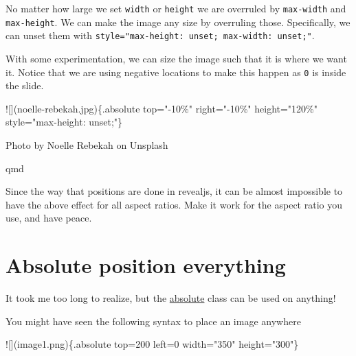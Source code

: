 \documentclass[
  letterpaper,
  DIV=11,
  numbers=noendperiod]{scrreprt}
\newenvironment{Shaded}{\begin{snugshade}}{\end{snugshade}}
\newcommand{\AlertTok}[1]{\textcolor[rgb]{0.68,0.00,0.00}{#1}}
\newcommand{\NormalTok}[1]{\textcolor[rgb]{0.00,0.23,0.31}{#1}}
\begin{document}
No matter how large we set \texttt{width} or \texttt{height} we are
overruled by \texttt{max-width} and \texttt{max-height}. We can make the
image any size by overruling those. Specifically, we can unset them with
\texttt{style="max-height:\ unset;\ max-width:\ unset;"}.

With some experimentation, we can size the image such that it is where
we want it. Notice that we are using negative locations to make this
happen as \texttt{0} is inside the slide.

\begin{Shaded}
\begin{Highlighting}[]
\AlertTok{![](noelle{-}rebekah.jpg)}\NormalTok{\{.absolute top="{-}10\%" right="{-}10\%" height="120\%" style="max{-}height: unset;"\}}
\end{Highlighting}
\end{Shaded}

Photo by Noelle Rebekah on Unsplash

qmd

\begin{tcolorbox}[enhanced jigsaw, titlerule=0mm, bottomrule=.15mm, opacityback=0, colbacktitle=quarto-callout-warning-color!10!white, colframe=quarto-callout-warning-color-frame, coltitle=black, breakable, toprule=.15mm, colback=white, bottomtitle=1mm, title=\textcolor{quarto-callout-warning-color}{\faExclamationTriangle}\hspace{0.5em}{Warning}, toptitle=1mm, arc=.35mm, left=2mm, leftrule=.75mm, rightrule=.15mm, opacitybacktitle=0.6]

Since the way that positions are done in revealjs, it can be almost
impossible to have the above effect for all aspect ratios. Make it work
for the aspect ratio you use, and have peace.

\end{tcolorbox}

\section{Absolute position
everything}\label{absolute-position-everything}

It took me too long to realize, but the
\href{https://quarto.org/docs/presentations/revealjs/advanced.html\#absolute-position}{absolute}
class can be used on anything!

You might have seen the following syntax to place an image anywhere

\begin{Shaded}
\begin{Highlighting}[]
\AlertTok{![](image1.png)}\NormalTok{\{.absolute top=200 left=0 width="350" height="300"\}}
\end{Highlighting}
\end{Shaded}
\end{document}
